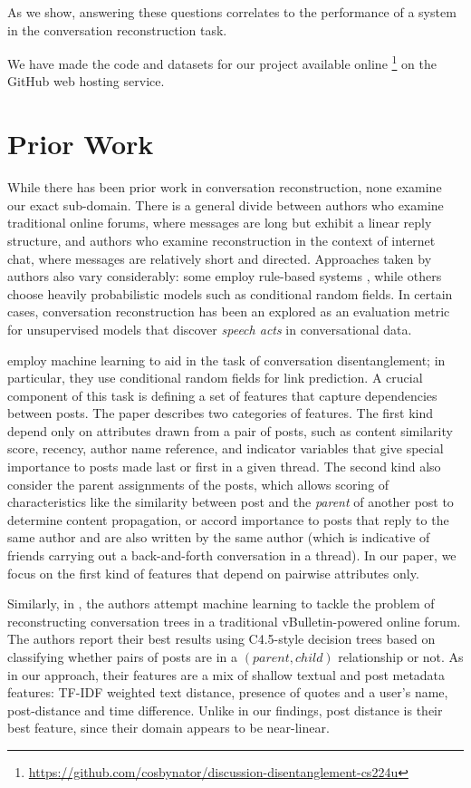 \documentclass{article}
\begin{document}
As we show, answering these questions correlates to the performance of a system
in the conversation reconstruction task. 

We have made the code and datasets for our project available online
\footnote{\url{https://github.com/cosbynator/discussion-disentanglement-cs224u}} on the
GitHub web hosting service.

\section{Prior Work}
\label{sec:prior_work}
While there has been prior work in conversation reconstruction, none examine
our exact sub-domain. There is a general divide between authors who examine
traditional online forums, where messages are long but exhibit a linear reply
structure, and authors who examine reconstruction in the context of internet
chat, where messages are relatively short and directed. Approaches taken by
authors also vary considerably: some employ rule-based systems \cite{Wang2008a}, while others
choose heavily probabilistic models such as conditional random fields. In
certain cases, conversation reconstruction has been an explored as an
evaluation metric for unsupervised models that discover \textit{speech acts}
in conversational data.

 employ machine
learning to aid in the task of conversation disentanglement; in particular,
they use conditional random fields for link prediction. A crucial component of
this task is defining a set of features that capture dependencies between
posts. The paper describes two categories of features. The first kind depend
only on attributes drawn from a pair of posts, such as content similarity
score, recency, author name reference, and indicator variables that give
special importance to posts made last or first in a given thread. The second
kind also consider the parent assignments of the posts, which allows scoring
of characteristics like the similarity between  post and the \emph{parent} of
another post to determine content propagation, or accord importance to posts
that reply to the same author and are also written by the same author (which
is indicative of friends carrying out a back-and-forth conversation in a
thread). In our paper, we focus on the first kind of features that depend on
pairwise attributes only.

Similarly, in , the authors attempt machine learning to
tackle the problem of reconstructing conversation trees in a traditional
vBulletin-powered online forum. The authors report their best results using
C4.5-style decision trees based on classifying whether pairs of posts are in a
$(parent, child)$ relationship or not. As in our approach, their features are
a mix of shallow textual and post metadata features: TF-IDF weighted text
distance, presence of quotes and a user's name, post-distance and time
difference. Unlike in our findings, post distance is their best feature, since
their domain appears to be near-linear.
\end{document}
